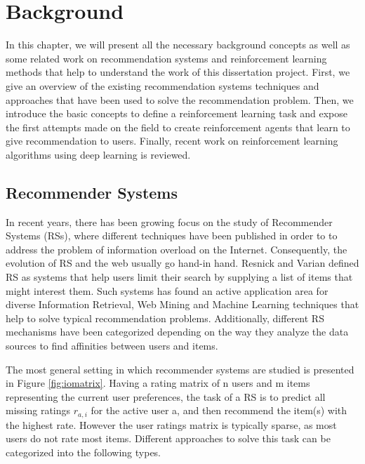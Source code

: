 \chapter{Background}
\label{sec:chapterlabel2}

In this chapter, we will present all the necessary background concepts as well as some related work on recommendation systems and reinforcement learning methods that help to understand the work of this dissertation project. First, we give an overview of the existing recommendation systems techniques and approaches that have been used to solve the recommendation problem. Then, we introduce the basic concepts to define a reinforcement learning task and expose the first attempts made on the field to create reinforcement agents that learn to give recommendation to users. Finally, recent work on reinforcement learning algorithms using deep learning is reviewed.

\section{Recommender Systems}

In recent years, there has been growing focus on the study of Recommender Systems (RSs), where different techniques have been published in order to to address the problem of information overload on the Internet. Consequently, the evolution of RS and the web usually go hand-in hand. Resnick and Varian\cite{resnick1997recommender}  defined RS as systems that help users limit their search by supplying a list of items that might interest them. Such systems has found an active application area for diverse Information Retrieval, Web Mining and Machine Learning techniques that help to solve typical recommendation problems. Additionally,  different RS mechanisms have been categorized depending on the way they analyze the data sources to find affinities between users and items. 

The most general setting in which recommender systems are studied is presented in Figure \ref{fig:iomatrix}. Having a rating matrix of n users and m items representing the current user preferences, the task of a RS is to predict all missing ratings $r_{a,i}$ for the active user a, and then recommend the item(s) with the highest rate\cite{melville2011recommender}. However the user ratings matrix is typically sparse, as most users do not rate most items. Different approaches to solve this task can be categorized into the following types.


